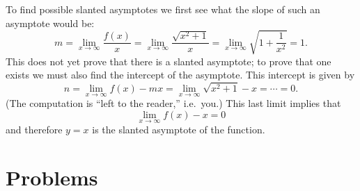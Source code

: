 To find possible slanted asymptotes we first see what the slope of
such an asymptote would be:
\[
m
= \lim_{x\to\infty}\frac{f(x)}{x}
= \lim_{x\to\infty}\frac{\sqrt{x^2+1}}{x}
= \lim_{x\to\infty}\sqrt{1+\frac{1}{x^2}} = 1.
\]
This does not yet prove that there is a slanted asymptote; to prove
that one exists we must also find the intercept of the asymptote.
This intercept is given by
\[
n = \lim_{x\to\infty} f(x) - mx
=\lim_{x\to\infty} \sqrt{x^2+1} - x
= \cdots
=0.
\]
(The computation is ``left to the reader,'' i.e.~you.)
This last limit implies that
\[
\lim_{x\to\infty} f(x) - x = 0
\]
and therefore $y=x$ is the slanted asymptote of the function.

\section{Problems}
\problemfont
